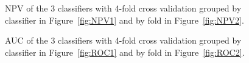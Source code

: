 \documentclass[a4paper,11pt]{article}
\begin{document}
\begin{figure}[!h]
	\centering
	\caption{NPV of the 3 classifiers with 4-fold cross validation grouped by classifier in Figure~\ref{fig:NPV1} and by fold in Figure~\ref{fig:NPV2}.}
	\label{fig:RealNPV}
\end{figure}

\begin{figure}[!h]
	\centering
	\caption{AUC of the 3 classifiers with 4-fold cross validation grouped by classifier in Figure~\ref{fig:ROC1} and by fold in Figure~\ref{fig:ROC2}.}
	\label{fig:RealROC}
\end{figure}
\end{document}
